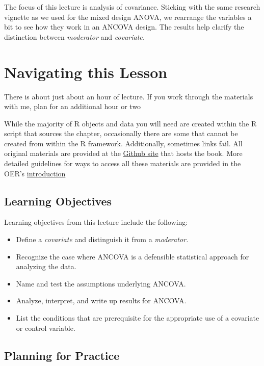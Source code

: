\documentclass[
  11pt,
]{book}
\providecommand{\tightlist}{%
  \setlength{\itemsep}{0pt}\setlength{\parskip}{0pt}}
\begin{document}
The focus of this lecture is analysis of covariance. Sticking with the same research vignette as we used for the mixed design ANOVA, we rearrange the variables a bit to see how they work in an ANCOVA design. The results help clarify the distinction between \emph{moderator} and \emph{covariate.}

\hypertarget{navigating-this-lesson-9}{%
\section{Navigating this Lesson}\label{navigating-this-lesson-9}}

There is about just about an hour of lecture. If you work through the materials with me, plan for an additional hour or two

While the majority of R objects and data you will need are created within the R script that sources the chapter, occasionally there are some that cannot be created from within the R framework. Additionally, sometimes links fail. All original materials are provided at the \href{https://github.com/lhbikos/ReCenterPsychStats}{Github site} that hosts the book. More detailed guidelines for ways to access all these materials are provided in the OER's \protect\hyperlink{ReCintro}{introduction}

\hypertarget{learning-objectives-9}{%
\subsection{Learning Objectives}\label{learning-objectives-9}}

Learning objectives from this lecture include the following:

\begin{itemize}
\tightlist
\item
  Define a \emph{covariate} and distinguish it from a \emph{moderator.}
\item
  Recognize the case where ANCOVA is a defensible statistical approach for analyzing the data.
\item
  Name and test the assumptions underlying ANCOVA.
\item
  Analyze, interpret, and write up results for ANCOVA.
\item
  List the conditions that are prerequisite for the appropriate use of a covariate or control variable.
\end{itemize}

\hypertarget{planning-for-practice-8}{%
\subsection{Planning for Practice}\label{planning-for-practice-8}}
\end{document}

